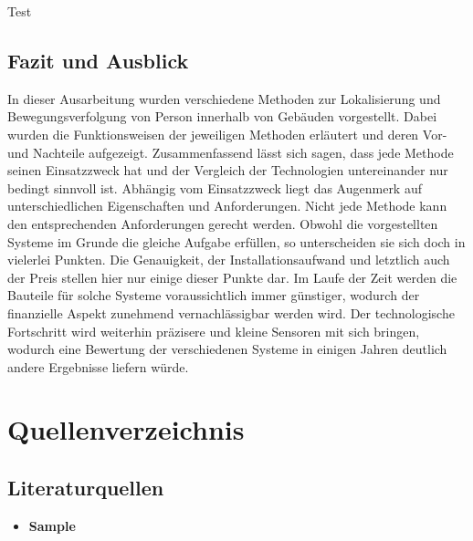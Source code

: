 Test

\subsection{Fazit und Ausblick}
In dieser Ausarbeitung wurden verschiedene Methoden zur Lokalisierung und Bewegungsverfolgung von Person innerhalb von Gebäuden vorgestellt. Dabei wurden die Funktionsweisen der jeweiligen Methoden erläutert und deren Vor- und Nachteile aufgezeigt.\newline\newline 
Zusammenfassend lässt sich sagen, dass jede Methode seinen Einsatzzweck hat und der Vergleich der Technologien untereinander nur bedingt sinnvoll ist. Abhängig vom Einsatzzweck liegt das Augenmerk auf unterschiedlichen Eigenschaften und Anforderungen. Nicht jede Methode kann den entsprechenden Anforderungen gerecht werden. Obwohl die vorgestellten Systeme im Grunde die gleiche Aufgabe erfüllen, so unterscheiden sie sich doch in vielerlei Punkten. Die Genauigkeit, der Installationsaufwand und letztlich auch der Preis stellen hier nur einige dieser Punkte dar. \newline\newline
Im Laufe der Zeit werden die Bauteile für solche Systeme voraussichtlich immer günstiger, wodurch der finanzielle Aspekt zunehmend vernachlässigbar werden wird. Der technologische Fortschritt wird weiterhin präzisere und kleine Sensoren mit sich bringen, wodurch eine Bewertung der verschiedenen Systeme in einigen Jahren deutlich andere Ergebnisse liefern würde. 

\newpage

\section{Quellenverzeichnis}
\subsection*{Literaturquellen}
\begin{itemize}[leftmargin=*]
\item[] \textbf{Sample}
\end{itemize}
